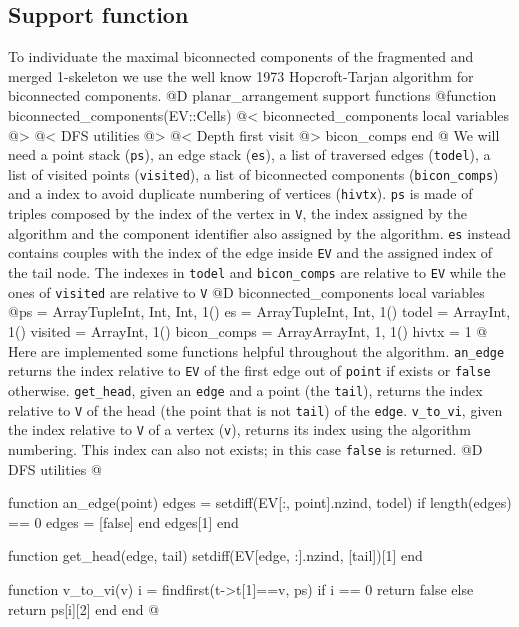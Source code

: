 \documentclass[10pt]{book}
\begin{document}
\subsection{Support function}
\label{sec:biconnected_components}
To individuate the maximal biconnected components of the fragmented and merged 1-skeleton
we use the well know 1973 Hopcroft-Tarjan algorithm for biconnected components\cite{Hopcroft-Tarjan}.
@D planar\_arrangement support functions
@{function biconnected_components(EV::Cells)
    @< biconnected\_components local variables @>
    @< DFS utilities @>
    @< Depth first visit @>
    bicon_comps
end
@}
We will need a point stack (\texttt{ps}), an edge stack (\texttt{es}), a list of traversed edges (\texttt{todel}), a list of 
visited points (\texttt{visited}), a list of biconnected components (\texttt{bicon\_comps}) and a index to avoid duplicate 
numbering of vertices (\texttt{hivtx}). \texttt{ps} is made of triples composed by the index of the vertex in \texttt{V}, 
the index assigned by the algorithm and the component identifier also assigned by the algorithm. \texttt{es} instead 
contains couples with the index of the edge inside \texttt{EV} and the assigned index of the tail node. The indexes 
in \texttt{todel} and \texttt{bicon\_comps} are relative to \texttt{EV} while the ones of \texttt{visited} are
relative to \texttt{V}
@D biconnected\_components local variables
@{ps = Array{Tuple{Int, Int, Int}, 1}()
es = Array{Tuple{Int, Int}, 1}()
todel = Array{Int, 1}()
visited = Array{Int, 1}()
bicon_comps = Array{Array{Int, 1}, 1}()
hivtx = 1
@}
Here are implemented some functions helpful throughout the algorithm.
\texttt{an\_edge} returns the index relative to \texttt{EV} of the first edge out of \texttt{point} if exists or 
\texttt{false} otherwise. \texttt{get\_head}, given an \texttt{edge} and a point (the \texttt{tail}), returns the 
index relative to \texttt{V} of the head (the point that is not \texttt{tail}) of the \texttt{edge}. 
\texttt{v\_to\_vi}, given the index relative to \texttt{V} of a vertex (\texttt{v}), returns its index using 
the algorithm numbering. This index can also not exists; in this case \texttt{false} is returned.
@D DFS utilities
@{function an_edge(point)
    edges = setdiff(EV[:, point].nzind, todel)
    if length(edges) == 0
        edges = [false]
    end
    edges[1]
end

function get_head(edge, tail)
    setdiff(EV[edge, :].nzind, [tail])[1]
end

function v_to_vi(v)
    i = findfirst(t->t[1]==v, ps)
    if i == 0
        return false
    else
        return ps[i][2]
    end
end
@}
\end{document}
